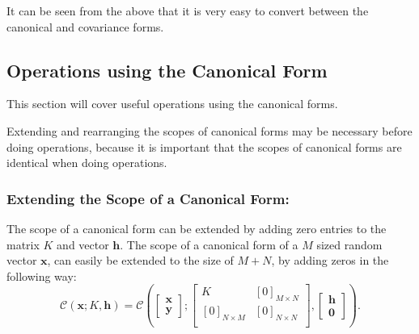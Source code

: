\documentclass[12pt,oneside,openany,a4paper, %
afrikaans,english,
]{memoir}
\numberwithin{equation}{chapter}
\begin{document}
It can be seen from the above that it is very easy to convert between the canonical and covariance forms. 
\subsection{Operations using the Canonical Form}
This section will cover useful operations using the canonical forms. 

Extending and rearranging the scopes of canonical forms may be necessary before doing operations, because it is important that the scopes of canonical forms are identical when doing operations. 
\subsubsection{Extending the Scope of a Canonical Form:}
The scope of a canonical form can be extended by adding zero entries to the matrix $K$ and vector $\bm{h}$. The scope of a canonical form of a $M$ sized random vector $\bm{x}$, can easily be extended to the size of $M + N$, by adding zeros in the following way:
\begin{equation}
\mathcal{C}\left(\bm{x};K,\bm{h}\right)
=
\mathcal{C}\left(
\begin{bmatrix}
\bm{x}\\
\bm{y}
\end{bmatrix};
\begin{bmatrix}
K & [0]_{M \times N}\\
[0]_{N \times M} & [0]_{N \times N}\\
\end{bmatrix},
\begin{bmatrix}
\bm{h}\\
\bm{0}
\end{bmatrix}
\right).
\end{equation}
\end{document}
